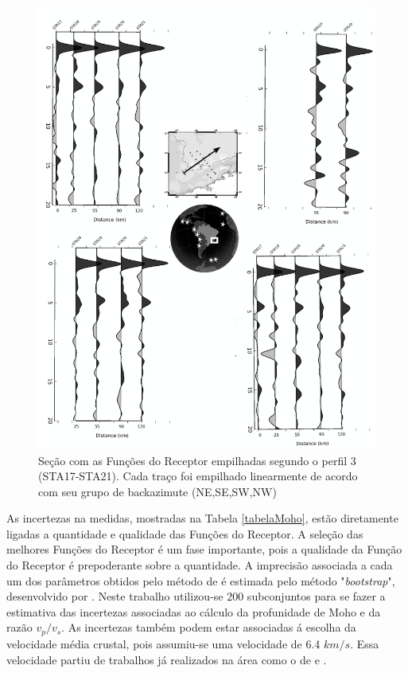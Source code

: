 \begin{figure}[!ht]
\centering
\includegraphics[scale=0.15]{Figs/RF_azimute_perfil3.png}
\caption{Seção com as Funções do Receptor empilhadas segundo o perfil 3 (STA17-STA21). Cada traço foi empilhado linearmente de acordo com seu grupo de backazimute (NE,SE,SW,NW)}
\label{RF_perfil3}
\end{figure}

As incertezas na medidas, mostradas na Tabela \ref{tabelaMoho}, estão diretamente ligadas a quantidade e qualidade das Funções do Receptor. A seleção das melhores Funções do Receptor é um fase importante, pois a qualidade da Função do Receptor é prepoderante sobre a quantidade. A imprecisão associada a cada um dos parâmetros obtidos pelo método de \cite{Zhu_Kanamori_2000} é estimada pelo método "\textit{bootstrap}", desenvolvido por \cite{efron_statistical_1991}. Neste trabalho utilizou-se 200  subconjuntos para se fazer a estimativa das incertezas associadas ao  cálculo da profunidade de Moho e da razão $v_{p}/v_{s}$. As incertezas também podem estar associadas á escolha da velocidade média crustal, pois assumiu-se uma velocidade de 6.4 $km/s$. Essa velocidade partiu de trabalhos já realizados na área como o de \cite{Bassini_1986} e \cite{sand_franca_crustal_2004}.

\pagebreak
